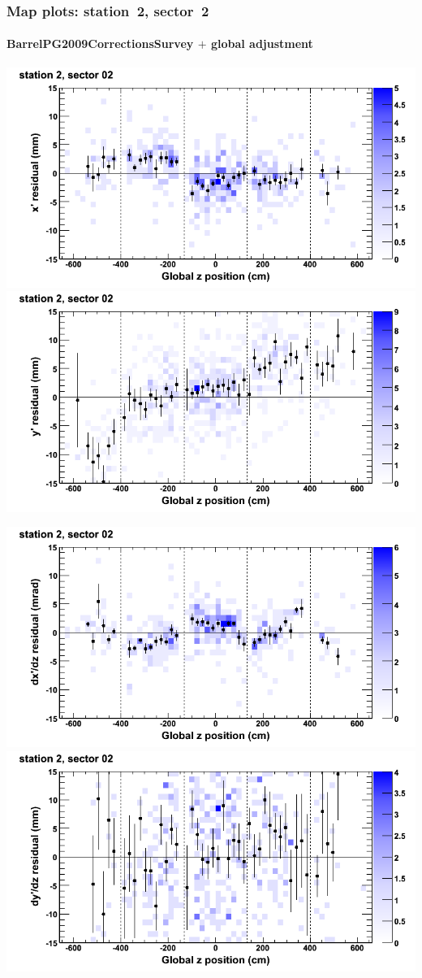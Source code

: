 \documentclass[compress]{beamer}
\begin{document}
\begin{frame}
\frametitle{Map plots: station~2, sector~2}
\framesubtitle{BarrelPG2009CorrectionsSurvey $+$ global adjustment}
\includegraphics[width=0.5\linewidth]{mapplots_re01/DTvsz_st2sec02_x.png}
\includegraphics[width=0.5\linewidth]{mapplots_re01/DTvsz_st2sec02_y.png}

\includegraphics[width=0.5\linewidth]{mapplots_re01/DTvsz_st2sec02_dxdz.png}
\includegraphics[width=0.5\linewidth]{mapplots_re01/DTvsz_st2sec02_dydz.png}
\end{frame}
\end{document}
